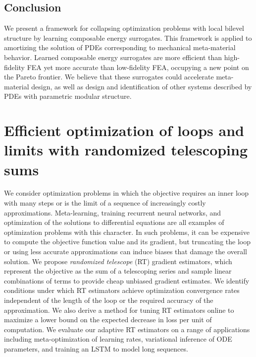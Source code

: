 \documentclass{puthesis}
\begin{document}







\section{Conclusion}
We present a framework for collapsing optimization problems with local bilevel structure by learning composable energy surrogates. This framework is applied to amortizing the solution of PDEs corresponding to mechanical meta-material behavior. Learned composable energy surrogates are more efficient than high-fidelity FEA yet more accurate than low-fidelity FEA, occupying a new point on the Pareto frontier. We believe that these surrogates could accelerate meta-material design, as well as design and identification of other systems described by PDEs with parametric modular structure.

\chapter{Efficient optimization of loops and limits with randomized telescoping sums}
We consider optimization problems in which the objective requires an inner loop with many steps or is the limit of a sequence of increasingly costly approximations.
Meta-learning, training recurrent neural networks, and optimization of the solutions to differential equations are all examples of optimization problems with this character.
In such problems, it can be expensive to compute the objective function value and its gradient, but truncating the loop or using less accurate approximations can induce biases that damage the overall solution.
We propose \emph{randomized telescope} (RT) gradient estimators, which represent the objective as the sum of a telescoping series and sample linear combinations of terms to provide cheap unbiased gradient estimates.
We identify conditions under which RT estimators achieve optimization convergence rates independent of the length of the loop or the required accuracy of the approximation.
We also derive a method for tuning RT estimators online to maximize a lower bound on the expected decrease in loss per unit of computation.
We evaluate our adaptive RT estimators on a range of applications including meta-optimization of learning rates, variational inference of ODE parameters, and training an LSTM to model long sequences.
\end{document}

